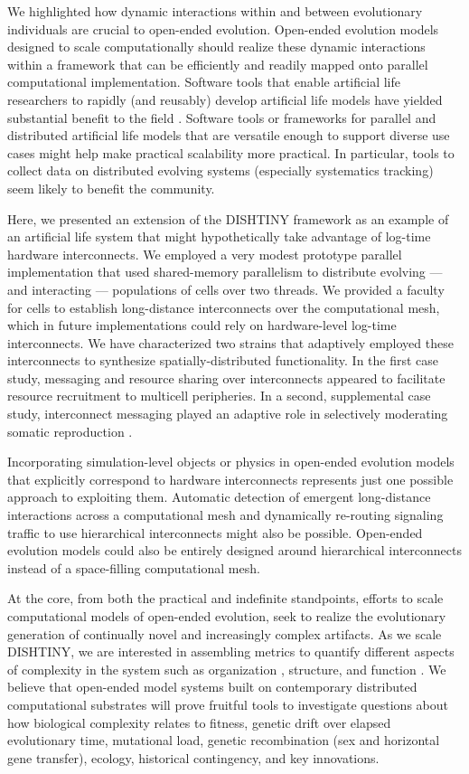 We highlighted how dynamic interactions within and between evolutionary individuals are crucial to open-ended evolution.
Open-ended evolution models designed to scale computationally should realize these dynamic interactions within a framework that can be efficiently and readily mapped onto parallel computational implementation.
Software tools that enable artificial life researchers to rapidly (and reusably) develop artificial life models have yielded substantial benefit to the field \citep{bohm2017mabe, charles_ofria_2019_2575607}.
Software tools or frameworks for parallel and distributed artificial life models that are versatile enough to support diverse use cases might help make practical scalability more practical.
In particular, tools to collect data on distributed evolving systems (especially systematics tracking) seem likely to benefit the community.

Here, we presented an extension of the DISHTINY framework as an example of an artificial life system that might hypothetically take advantage of log-time hardware interconnects.
We employed a very modest prototype parallel implementation that used shared-memory parallelism to distribute evolving --- and interacting --- populations of cells over two threads.
We provided a faculty for cells to establish long-distance interconnects over the computational mesh, which in future implementations could rely on hardware-level log-time interconnects.
We have characterized two strains that adaptively employed these interconnects to synthesize spatially-distributed functionality.
In the first case study, messaging and resource sharing over interconnects appeared to facilitate resource recruitment to multicell peripheries.
In a second, supplemental case study, interconnect messaging played an adaptive role in selectively moderating somatic reproduction \citep{Moreno_Ofria_2020}.

Incorporating simulation-level objects or physics in open-ended evolution models that explicitly correspond to hardware interconnects represents just one possible approach to exploiting them.
Automatic detection of emergent long-distance interactions across a computational mesh and dynamically re-routing signaling traffic to use hierarchical interconnects might also be possible.
Open-ended evolution models could also be entirely designed around hierarchical interconnects instead of a space-filling computational mesh.

At the core, from both the practical and indefinite standpoints, efforts to scale computational models of open-ended evolution, seek to realize the evolutionary generation of continually novel and increasingly complex artifacts.
As we scale DISHTINY, we are interested in assembling metrics to quantify different aspects of complexity in the system such as organization \citep{goldsby2012task}, structure, and function \citep{goldsby2014evolutionary}.
We %
believe that open-ended model systems built on contemporary distributed computational substrates will prove fruitful tools to investigate questions about how biological complexity relates to fitness, genetic drift over elapsed evolutionary time, mutational load, genetic recombination (sex and horizontal gene transfer), ecology, historical contingency, and key innovations.

